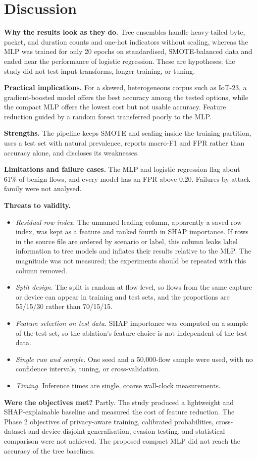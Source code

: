 \section{Discussion}
\textbf{Why the results look as they do.} Tree ensembles handle heavy-tailed byte, packet, and duration counts and one-hot indicators without scaling, whereas the MLP was trained for only 20 epochs on standardised, SMOTE-balanced data and ended near the performance of logistic regression. These are hypotheses; the study did not test input transforms, longer training, or tuning.

\textbf{Practical implications.} For a skewed, heterogeneous corpus such as IoT-23, a gradient-boosted model offers the best accuracy among the tested options, while the compact MLP offers the lowest cost but not usable accuracy. Feature reduction guided by a random forest transferred poorly to the MLP.

\textbf{Strengths.} The pipeline keeps SMOTE and scaling inside the training partition, uses a test set with natural prevalence, reports macro-F1 and FPR rather than accuracy alone, and discloses its weaknesses.

\textbf{Limitations and failure cases.} The MLP and logistic regression flag about 61\% of benign flows, and every model has an FPR above 0.20. Failures by attack family were not analysed.

\textbf{Threats to validity.}
\begin{itemize}
\item \textit{Residual row index.} The unnamed leading column, apparently a saved row index, was kept as a feature and ranked fourth in SHAP importance. If rows in the source file are ordered by scenario or label, this column leaks label information to tree models and inflates their results relative to the MLP. The magnitude was not measured; the experiments should be repeated with this column removed.
\item \textit{Split design.} The split is random at flow level, so flows from the same capture or device can appear in training and test sets, and the proportions are 55/15/30 rather than 70/15/15.
\item \textit{Feature selection on test data.} SHAP importance was computed on a sample of the test set, so the ablation's feature choice is not independent of the test data.
\item \textit{Single run and sample.} One seed and a 50,000-flow sample were used, with no confidence intervals, tuning, or cross-validation.
\item \textit{Timing.} Inference times are single, coarse wall-clock measurements.
\end{itemize}

\textbf{Were the objectives met?} Partly. The study produced a lightweight and SHAP-explainable baseline and measured the cost of feature reduction. The Phase 2 objectives of privacy-aware training, calibrated probabilities, cross-dataset and device-disjoint generalisation, evasion testing, and statistical comparison were not achieved. The proposed compact MLP did not reach the accuracy of the tree baselines.